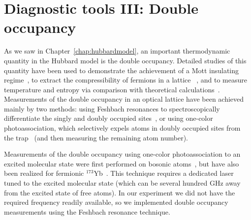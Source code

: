 \chapter{Diagnostic tools III:  Double occupancy}

As we saw in Chapter~\ref{chap:hubbardmodel}, an important thermodynamic
quantity in the Hubbard model is the double occupancy.  Detailed studies of
this quantity have been used to demonstrate the achievement of a Mott
insulating regime~\cite{Jordens2008,Schneider2008}, to extract the
compressibility of fermions in a lattice ~\cite{Scarola2009},  and to measure
temperature and entropy via comparison with theoretical
calculations~\cite{Jordens2010b}.  Measurements of the double occupancy in an
optical lattice have been achieved mainly by two methods: using Feshbach
resonances to spectroscopically differentiate the singly and doubly occupied
sites~\cite{RevModPhys.82.1225}, or using one-color photoassociation, which
selectively expels atoms in doubly occupied sites from the
trap~\cite{PhysRevLett.93.073002} (and then measuring the remaining atom
number).

Measurements of the double occupancy using one-color photoassociation to an
excited molecular state were first performed on bosonic
atoms~\cite{PhysRevLett.93.073002,PhysRevLett.96.050402}, but have also been
realized for fermionic $^{173}$Yb~\cite{Taie2012}. This technique requires a
dedicated laser tuned to the excited molecular state (which can be several
hundred GHz away from the excited state of free atoms).  In our experiment we
did not have the required frequency readily available, so we implemented
double occupancy measurements using the Feshbach resonance technique. 

